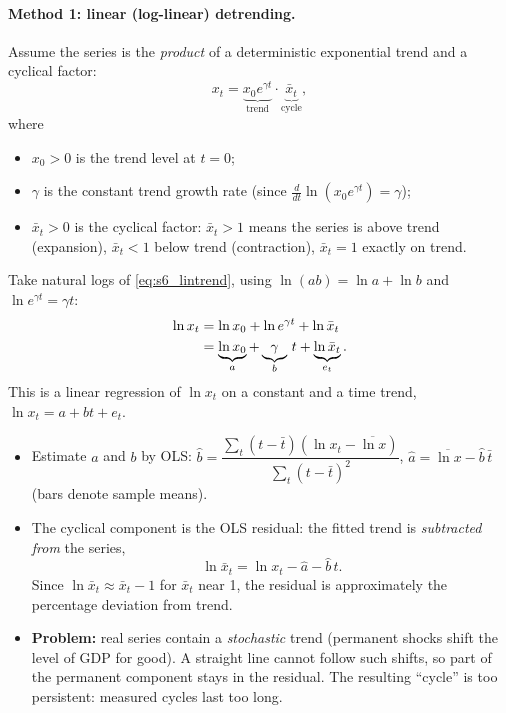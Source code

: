 \paragraph{Method 1: linear (log-linear) detrending.}
Assume the series is the \emph{product} of a deterministic exponential trend and a cyclical factor:
\begin{equation}\label{eq:s6_lintrend}
x_t=\underbrace{x_0e^{\gamma t}}_{\text{trend}}\cdot\underbrace{\bar x_t}_{\text{cycle}} ,
\end{equation}
where
\begin{itemize}
  \item $x_0>0$ is the trend level at $t=0$;
  \item $\gamma$ is the constant trend growth rate (since $\frac{d}{dt}\ln(x_0e^{\gamma t})=\gamma$);
  \item $\bar x_t>0$ is the cyclical factor: $\bar x_t>1$ means the series is above trend (expansion), $\bar x_t<1$ below trend (contraction), $\bar x_t=1$ exactly on trend.
\end{itemize}
Take natural logs of \eqref{eq:s6_lintrend}, using $\ln(ab)=\ln a+\ln b$ and $\ln e^{\gamma t}=\gamma t$:
\begin{align}
\ln x_t&=\ln x_0+\ln e^{\gamma t}+\ln\bar x_t \notag\\
&=\underbrace{\ln x_0}_{a}+\underbrace{\gamma}_{b}\,t+\underbrace{\ln\bar x_t}_{e_t}. \label{eq:s6_linreg}
\end{align}
This is a linear regression of $\ln x_t$ on a constant and a time trend, $\ln x_t=a+bt+e_t$.
\begin{itemize}
  \item Estimate $a$ and $b$ by OLS: $\hat b=\dfrac{\sum_t(t-\bar t)(\ln x_t-\overline{\ln x})}{\sum_t(t-\bar t)^2}$, $\hat a=\overline{\ln x}-\hat b\,\bar t$ (bars denote sample means).
  \item The cyclical component is the OLS residual: the fitted trend is \emph{subtracted from} the series,
  \[
  \ln\bar x_t=\ln x_t-\hat a-\hat b\,t .
  \]
  Since $\ln\bar x_t\approx\bar x_t-1$ for $\bar x_t$ near 1, the residual is approximately the percentage deviation from trend.
  \item \textbf{Problem:} real series contain a \emph{stochastic} trend (permanent shocks shift the level of GDP for good). A straight line cannot follow such shifts, so part of the permanent component stays in the residual. The resulting ``cycle'' is too persistent: measured cycles last too long.
\end{itemize}

